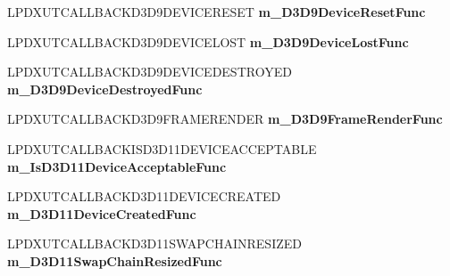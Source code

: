 \begin{DoxyCompactItemize}
\item 
\hypertarget{struct_d_x_u_t_state_1_1_s_t_a_t_e_a1cedc094f739a44f93b3d74bc8a7d739}{L\+P\+D\+X\+U\+T\+C\+A\+L\+L\+B\+A\+C\+K\+D3\+D9\+D\+E\+V\+I\+C\+E\+R\+E\+S\+E\+T {\bfseries m\+\_\+\+D3\+D9\+Device\+Reset\+Func}}\label{struct_d_x_u_t_state_1_1_s_t_a_t_e_a1cedc094f739a44f93b3d74bc8a7d739}

\item 
\hypertarget{struct_d_x_u_t_state_1_1_s_t_a_t_e_ad4f44bac2db65c9449c04d52ad69f4c2}{L\+P\+D\+X\+U\+T\+C\+A\+L\+L\+B\+A\+C\+K\+D3\+D9\+D\+E\+V\+I\+C\+E\+L\+O\+S\+T {\bfseries m\+\_\+\+D3\+D9\+Device\+Lost\+Func}}\label{struct_d_x_u_t_state_1_1_s_t_a_t_e_ad4f44bac2db65c9449c04d52ad69f4c2}

\item 
\hypertarget{struct_d_x_u_t_state_1_1_s_t_a_t_e_ad0b900d3ddd4506db12d1fd39a09cd69}{L\+P\+D\+X\+U\+T\+C\+A\+L\+L\+B\+A\+C\+K\+D3\+D9\+D\+E\+V\+I\+C\+E\+D\+E\+S\+T\+R\+O\+Y\+E\+D {\bfseries m\+\_\+\+D3\+D9\+Device\+Destroyed\+Func}}\label{struct_d_x_u_t_state_1_1_s_t_a_t_e_ad0b900d3ddd4506db12d1fd39a09cd69}

\item 
\hypertarget{struct_d_x_u_t_state_1_1_s_t_a_t_e_a226e38dae1645235be52ee025c12ea56}{L\+P\+D\+X\+U\+T\+C\+A\+L\+L\+B\+A\+C\+K\+D3\+D9\+F\+R\+A\+M\+E\+R\+E\+N\+D\+E\+R {\bfseries m\+\_\+\+D3\+D9\+Frame\+Render\+Func}}\label{struct_d_x_u_t_state_1_1_s_t_a_t_e_a226e38dae1645235be52ee025c12ea56}

\item 
\hypertarget{struct_d_x_u_t_state_1_1_s_t_a_t_e_a40134bdbde6f2d4e27b5d7dfa1f6cb4e}{L\+P\+D\+X\+U\+T\+C\+A\+L\+L\+B\+A\+C\+K\+I\+S\+D3\+D11\+D\+E\+V\+I\+C\+E\+A\+C\+C\+E\+P\+T\+A\+B\+L\+E {\bfseries m\+\_\+\+Is\+D3\+D11\+Device\+Acceptable\+Func}}\label{struct_d_x_u_t_state_1_1_s_t_a_t_e_a40134bdbde6f2d4e27b5d7dfa1f6cb4e}

\item 
\hypertarget{struct_d_x_u_t_state_1_1_s_t_a_t_e_a67e5bce1a8be795061af9bf01bec3211}{L\+P\+D\+X\+U\+T\+C\+A\+L\+L\+B\+A\+C\+K\+D3\+D11\+D\+E\+V\+I\+C\+E\+C\+R\+E\+A\+T\+E\+D {\bfseries m\+\_\+\+D3\+D11\+Device\+Created\+Func}}\label{struct_d_x_u_t_state_1_1_s_t_a_t_e_a67e5bce1a8be795061af9bf01bec3211}

\item 
\hypertarget{struct_d_x_u_t_state_1_1_s_t_a_t_e_aab5fdd7229a43778dfa89a1775308519}{L\+P\+D\+X\+U\+T\+C\+A\+L\+L\+B\+A\+C\+K\+D3\+D11\+S\+W\+A\+P\+C\+H\+A\+I\+N\+R\+E\+S\+I\+Z\+E\+D {\bfseries m\+\_\+\+D3\+D11\+Swap\+Chain\+Resized\+Func}}\label{struct_d_x_u_t_state_1_1_s_t_a_t_e_aab5fdd7229a43778dfa89a1775308519}


\end{DoxyCompactItemize}
